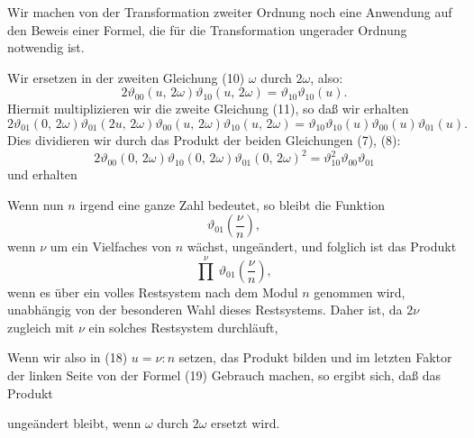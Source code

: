 Wir machen von der Transformation zweiter Ordnung noch eine Anwendung auf den Beweis einer Formel, die für die Transformation ungerader Ordnung notwendig ist.

Wir ersetzen in der zweiten Gleichung (10) $\omega$ durch $2\omega$, also:
\[
2\vartheta_{00}(u,\,2\omega)\vartheta_{10}(u,\,2\omega) = \vartheta_{10}\vartheta_{10}(u).
\]
Hiermit multiplizieren wir die zweite Gleichung (11), so daß wir erhalten
\[
2\vartheta_{01}(0,\,2\omega)\vartheta_{01}(2u,\,2\omega)\vartheta_{00}(u,\,2\omega)\vartheta_{10}(u,\,2\omega)
= \vartheta_{10}\vartheta_{10}(u)\vartheta_{00}(u)\vartheta_{01}(u).
\]
Dies dividieren wir durch das Produkt der beiden Gleichungen (7), (8):
\[
2\vartheta_{00}(0,\,2\omega)\vartheta_{10}(0,\,2\omega)\vartheta_{01}(0,\,2\omega)^2 = \vartheta_{10}^2\vartheta_{00}\vartheta_{01}
\]
und erhalten


Wenn nun $n$ irgend eine  ganze Zahl bedeutet, so bleibt die Funktion
\[
\vartheta_{01}\left(\frac{\nu}{n}\right),
\]
wenn $\nu$ um ein Vielfaches von $n$ wächst, ungeändert, und folglich ist das Produkt
\[
\overset{\nu}{\prod}\ \vartheta_{01}\left(\frac{\nu}{n}\right),
\]
wenn es über ein volles Restsystem nach dem Modul $n$ genommen wird, unabhängig von der besonderen Wahl dieses Restsystems. Daher ist, da $2\nu$ zugleich mit $\nu$ ein solches Restsystem durchläuft,


Wenn wir also in (18) $u = \nu:n$ setzen, das Produkt bilden und im letzten Faktor der linken Seite von der Formel (19) Gebrauch machen, so ergibt sich, daß das Produkt


ungeändert bleibt, wenn $\omega$ durch $2\omega$ ersetzt wird.
